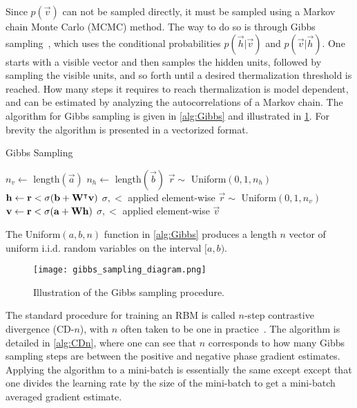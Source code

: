 Since \( p(\vec{v}) \) can not be sampled directly, it must be sampled using a Markov chain Monte Carlo (MCMC) method.
The way to do so is through Gibbs sampling~\cite{hinton_rbm_training}, which uses the conditional probabilities \( p(\vec{h}|\vec{v}) \) and \( p(\vec{v}|\vec{h}) \).
One starts with a visible vector and then samples the hidden units, followed by sampling the visible units, and so forth until a desired thermalization threshold is reached.
How many steps it requires to reach thermalization is model dependent, and can be estimated by analyzing the autocorrelations of a Markov chain.
The algorithm for Gibbs sampling is given in \cref{alg:Gibbs} and illustrated in \cref{fig:gibbs_sampling_diagram}.
For brevity the algorithm is presented in a vectorized format.

\begin{algorithm}
\caption{Gibbs Sampling}
\begin{algorithmic}[1]
        \State $n_v \gets$ length$(\vec{a})$
        \State $n_h \gets$ length$(\vec{b})$
            \State $\vec{r} \sim$ Uniform$(0, 1, n_h)$
            \State $\mathbf{h} \gets \mathbf{r} < \sigma(\mathbf{b} + \mathbf{W}^\intercal\mathbf{v})$
                \Comment $\sigma, <$ applied element-wise
            \State $\vec{r} \sim$ Uniform$(0, 1, n_v)$
            \State $\mathbf{v} \gets \mathbf{r} < \sigma(\mathbf{a} + \mathbf{W}\mathbf{h})$
                \Comment $\sigma, <$ applied element-wise
        \EndFor
        \State \Return $\vec{v}$
    \EndProcedure
\end{algorithmic}
\label{alg:Gibbs}
\end{algorithm}
The Uniform$(a, b, n)$ function in \cref{alg:Gibbs} produces a length \( n \) vector of uniform i.i.d. random variables on the interval $[a, b)$.

\begin{figure}
    \begin{center}
        \texttt{[image: gibbs\_sampling\_diagram.png]}
    \end{center}
    \caption{Illustration of the Gibbs sampling procedure.}
    \label{fig:gibbs_sampling_diagram}
\end{figure}

The standard procedure for training an RBM is called \( n \)-step contrastive divergence (CD-\( n \)), with \( n \) often taken to be one in practice~\cite{hinton_rbm_training}.
The algorithm is detailed in \cref{alg:CDn}, where one can see that \( n \) corresponds to how many Gibbs sampling steps are between the positive and negative phase gradient estimates.
Applying the algorithm to a mini-batch is essentially the same except except that one divides the learning rate by the size of the mini-batch to get a mini-batch averaged gradient estimate.

